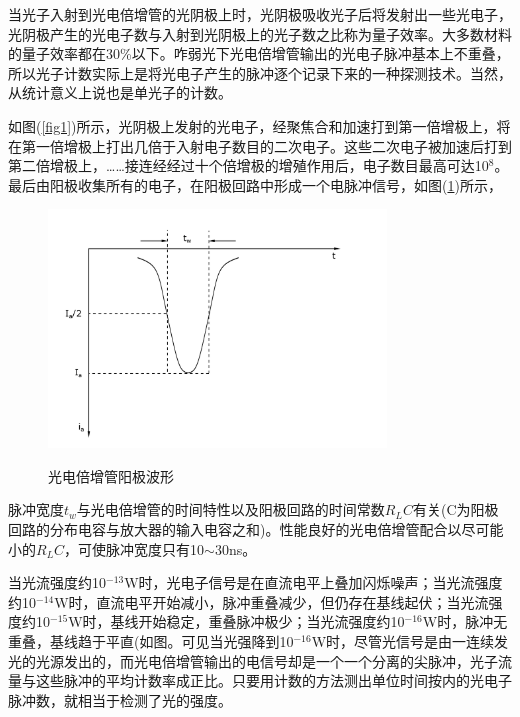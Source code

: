 \documentclass[a4paper]{article}
\begin{document}
当光子入射到光电倍增管的光阴极上时，光阴极吸收光子后将发射出一些光电子，光阴极产生的光电子数与入射到光阴极上的光子数之比称为量子效率。大多数材料的量子效率都在30\%以下。咋弱光下光电倍增管输出的光电子脉冲基本上不重叠，所以光子计数实际上是将光电子产生的脉冲逐个记录下来的一种探测技术。当然，从统计意义上说也是单光子的计数。

如图(\ref{fig1})所示，光阴极上发射的光电子，经聚焦合和加速打到第一倍增极上，将在第一倍增极上打出几倍于入射电子数目的二次电子。这些二次电子被加速后打到第二倍增极上，……接连经经过十个倍增极的增殖作用后，电子数目最高可达10$^8$。最后由阳极收集所有的电子，在阳极回路中形成一个电脉冲信号，如图(\ref{fig2})所示，
\begin{figure}[!h]
\centering
\includegraphics[width=0.8\textwidth]{fig/fig2.pdf}\\
\caption{光电倍增管阳极波形}\label{fig2}
\end{figure}
脉冲宽度$t_w$与光电倍增管的时间特性以及阳极回路的时间常数$R_LC$有关(C为阳极回路的分布电容与放大器的输入电容之和)。性能良好的光电倍增管配合以尽可能小的$R_LC$，可使脉冲宽度只有10$\sim$30ns。

当光流强度约10$^{-13}$W时，光电子信号是在直流电平上叠加闪烁噪声；当光流强度约10$^{-14}$W时，直流电平开始减小，脉冲重叠减少，但仍存在基线起伏；当光流强度约10$^{-15}$W时，基线开始稳定，重叠脉冲极少；当光流强度约10$^{-16}$W时，脉冲无重叠，基线趋于平直(如图。可见当光强降到10$^{-16}$W时，尽管光信号是由一连续发光的光源发出的，而光电倍增管输出的电信号却是一个一个分离的尖脉冲，光子流量与这些脉冲的平均计数率成正比。只要用计数的方法测出单位时间按内的光电子脉冲数，就相当于检测了光的强度。
\end{document}
